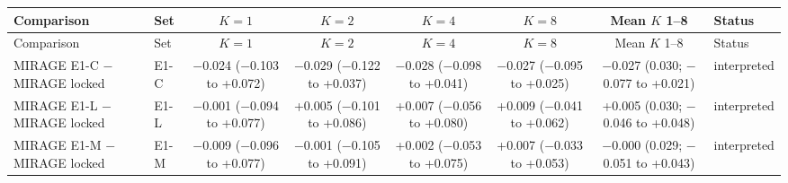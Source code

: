 \begin{longtable}{@{}p{3.6cm}lcccccp{2.6cm}@{}}
\toprule
Comparison & Set & $K=1$ & $K=2$ & $K=4$ & $K=8$ & Mean $K$ 1--8 & Status \\
\midrule
\endfirsthead
\toprule
Comparison & Set & $K=1$ & $K=2$ & $K=4$ & $K=8$ & Mean $K$ 1--8 & Status \\
\midrule
\endhead
\bottomrule
\endfoot
\bottomrule
\endlastfoot
MIRAGE E1-C $-$ MIRAGE locked & E1-C & \makecell{$-$0.024\\{\scriptsize ($-$0.103 to +0.072)}} & \makecell{$-$0.029\\{\scriptsize ($-$0.122 to +0.037)}} & \makecell{$-$0.028\\{\scriptsize ($-$0.098 to +0.041)}} & \makecell{$-$0.027\\{\scriptsize ($-$0.095 to +0.025)}} & \makecell{$-$0.027\\{\scriptsize (0.030; $-$0.077 to +0.021)}} & interpreted \\
\addlinespace[2pt]
MIRAGE E1-L $-$ MIRAGE locked & E1-L & \makecell{$-$0.001\\{\scriptsize ($-$0.094 to +0.077)}} & \makecell{+0.005\\{\scriptsize ($-$0.101 to +0.086)}} & \makecell{+0.007\\{\scriptsize ($-$0.056 to +0.080)}} & \makecell{+0.009\\{\scriptsize ($-$0.041 to +0.062)}} & \makecell{+0.005\\{\scriptsize (0.030; $-$0.046 to +0.048)}} & interpreted \\
\addlinespace[2pt]
MIRAGE E1-M $-$ MIRAGE locked & E1-M & \makecell{$-$0.009\\{\scriptsize ($-$0.096 to +0.077)}} & \makecell{$-$0.001\\{\scriptsize ($-$0.105 to +0.091)}} & \makecell{+0.002\\{\scriptsize ($-$0.053 to +0.075)}} & \makecell{+0.007\\{\scriptsize ($-$0.033 to +0.053)}} & \makecell{$-$0.000\\{\scriptsize (0.029; $-$0.051 to +0.043)}} & interpreted \\

\end{longtable}
